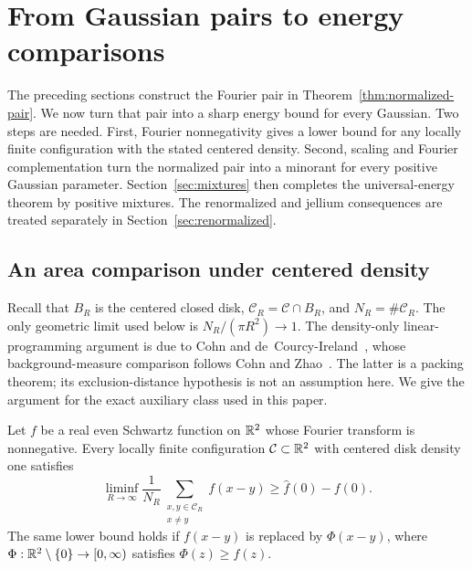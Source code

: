 \section{From Gaussian pairs to energy comparisons}
\label{sec:energy}

The preceding sections construct the Fourier pair in
Theorem~\ref{thm:normalized-pair}.  We now turn that pair into a sharp energy
bound for every Gaussian.  Two steps are needed.  First, Fourier nonnegativity
gives a lower bound for any locally finite configuration with the stated
centered density.  Second, scaling and Fourier complementation turn the
normalized pair into a minorant for every positive Gaussian parameter.
Section~\ref{sec:mixtures} then completes the universal-energy theorem by
positive mixtures. The renormalized and jellium consequences are treated
separately in Section~\ref{sec:renormalized}.

\subsection{An area comparison under centered density}

Recall that $B_R$ is the centered closed disk,
$\mathcal C_R=\mathcal C\cap B_R$, and $N_R=\#\mathcal C_R$.
The only geometric limit used below is $N_R/(\pi R^2)\to1$.
The density-only linear-programming argument is due to
Cohn and de~Courcy-Ireland~\citep[Proposition~2.2]{CohnDeCourcyIreland2018}, whose background-measure
comparison follows Cohn and Zhao~\citep[Theorem~3.3]{CohnZhao2014}.  The latter is a packing
theorem; its exclusion-distance hypothesis is not an assumption here.
We give the argument for the exact auxiliary class used in this paper.

\begin{proposition}
\label{prop:density-lp}
Let $f$ be a real even Schwartz function on $\mathbb R^2$ whose Fourier transform is
nonnegative.  Every locally finite configuration $\mathcal C\subset\mathbb R^2$
with centered disk density one satisfies
\begin{equation}\label{eq:density-lp}
 \liminf_{R\to\infty}\frac1{N_R}
 \sum_{\substack{x,y\in\mathcal C_R\\x\ne y}}f(x-y)
 \ge \widehat f(0)-f(0).
\end{equation}
The same lower bound holds if $f(x-y)$ is replaced by $\Phi(x-y)$, where
$\Phi:\mathbb R^2\setminus\{0\}\to[0,\infty)$ satisfies $\Phi(z)\ge f(z)$.
\end{proposition}

